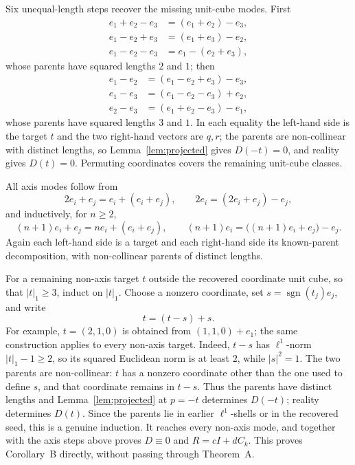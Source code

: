 \documentclass[11pt]{article}
\theoremstyle{definition}
\theoremstyle{remark}
\theoremstyle{plain}
\DeclareMathOperator{\sgn}{sgn}
\newcommand{\Ck}{C_k}
\begin{document}
Six unequal-length steps recover the missing unit-cube modes. First
\begin{equation}
\label{eq:boot1}
\begin{aligned}
e_{1}+e_{2}-e_{3}&=(e_{1}+e_{2})-e_{3},\\
e_{1}-e_{2}+e_{3}&=(e_{1}+e_{3})-e_{2},\\
e_{1}-e_{2}-e_{3}&=e_{1}-(e_{2}+e_{3}),
\end{aligned}
\end{equation}
whose parents have squared lengths $2$ and $1$; then
\begin{equation}
\label{eq:boot2}
\begin{aligned}
e_{1}-e_{2}&=(e_{1}-e_{2}+e_{3})-e_{3},\\
e_{1}-e_{3}&=(e_{1}-e_{2}-e_{3})+e_{2},\\
e_{2}-e_{3}&=(e_{1}+e_{2}-e_{3})-e_{1},
\end{aligned}
\end{equation}
whose parents have squared lengths $3$ and $1$. In each equality the left-hand
side is the target $t$ and the two right-hand vectors are $q,r$; the parents
are non-collinear with distinct lengths, so Lemma~\ref{lem:projected} gives
$D(-t)=0$, and reality gives $D(t)=0$. Permuting coordinates covers the
remaining unit-cube classes.

All axis modes follow from
\begin{equation}
\label{eq:axis1}
2e_{i}+e_{j}=e_{i}+(e_{i}+e_{j}),
\qquad
2e_{i}=(2e_{i}+e_{j})-e_{j},
\end{equation}
and inductively, for $n\ge2$,
\begin{equation}
\label{eq:axis2}
(n+1)e_{i}+e_{j}=ne_{i}+(e_{i}+e_{j}),
\qquad
(n+1)e_{i}=\bigl((n+1)e_{i}+e_{j}\bigr)-e_{j}.
\end{equation}
Again each left-hand side is a target and each right-hand side its known-parent
decomposition, with non-collinear parents of distinct lengths.

For a remaining non-axis target $t$ outside the recovered coordinate unit
cube, so that $|t|_{1}\ge3$, induct on $|t|_{1}$. Choose a nonzero coordinate,
set $s=\sgn(t_{j})e_{j}$, and write
\begin{equation}
\label{eq:generalstep}
t=(t-s)+s .
\end{equation}
For example, $t=(2,1,0)$ is obtained from $(1,1,0)+e_{1}$; the same
construction applies to every non-axis target. Indeed, $t-s$ has
$\ell^{1}$-norm $|t|_{1}-1\ge2$, so its squared Euclidean norm is at least
$2$, while $|s|^{2}=1$. The two parents are non-collinear: $t$ has a nonzero
coordinate other than the one used to define $s$, and that coordinate remains
in $t-s$. Thus the parents have distinct lengths and Lemma~\ref{lem:projected}
at $p=-t$ determines $D(-t)$; reality determines $D(t)$. Since the parents
lie in earlier $\ell^{1}$-shells or in the recovered seed, this is a genuine
induction. It reaches every non-axis mode, and together with the axis steps
above proves $D\equiv0$ and $R=cI+d\Ck$. This proves Corollary~B directly,
without passing through Theorem~A.
\end{document}
